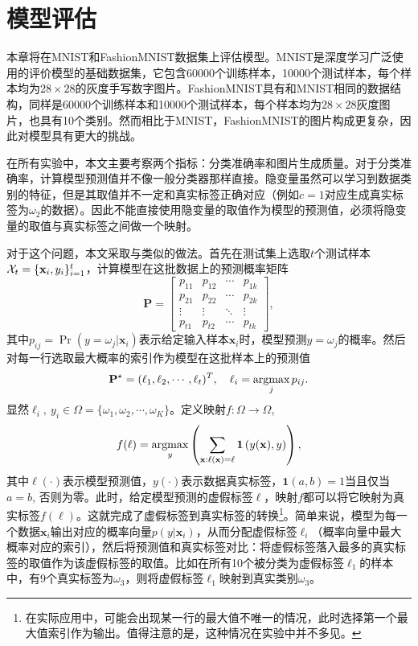 \chapter{模型评估}\label{chap:experiments}
本章将在MNIST\citep{lecun1989backpropagation}和FashionMNIST\citep{xiao2017/online}数据集上评估模型。MNIST是深度学习广泛使用的评价模型的基础数据集，它包含60000个训练样本，10000个测试样本，每个样本均为$28\times 28$的灰度手写数字图片。FashionMNIST具有和MNIST相同的数据结构，同样是60000个训练样本和10000个测试样本，每个样本均为$28\times 28$灰度图片，也具有10个类别。然而相比于MNIST，FashionMNIST的图片构成更复杂，因此对模型具有更大的挑战。

在所有实验中，本文主要考察两个指标：分类准确率和图片生成质量。对于分类准确率，计算模型预测值并不像一般分类器那样直接。隐变量虽然可以学习到数据类别的特征，但是其取值并不一定和真实标签正确对应（例如$c=1$对应生成真实标签为$\omega_2$的数据）。因此不能直接使用隐变量的取值作为模型的预测值，必须将隐变量的取值与真实标签之间做一个映射。

对于这个问题，本文采取与\citet{springenberg2015unsupervised}类似的做法。首先在测试集上选取$t$个测试样本$\mathcal{X}_t = \{\mathbf{x}_i, y_i\}_{i=1}^t$，计算模型在这批数据上的预测概率矩阵
\[
  \mathbf{P} = 
\begin{bmatrix}
  p_{11} & p_{12} & \cdots & p_{1k} \\
  p_{21} & p_{22} & \cdots & p_{2k} \\
  \vdots & \vdots & \ddots & \vdots \\
  p_{t1} & p_{t2} & \cdots & p_{tk}
\end{bmatrix},
\]
其中$p_{ij} = \Pr(y=\omega_j | \mathbf{x}_i)$表示给定输入样本$\mathbf{x}_i$时，模型预测$y = \omega_j$的概率。然后对每一行选取最大概率的索引作为模型在这批样本上的预测值
\[
  \mathbf{P}^{\star} = (\ell_1, \ell_2, \cdots, \ell_t)^T, \quad \ell_i = \mathop{\text{argmax}}_j p_{ij}.
\]
显然$\ell_i, ~y_i \in \Omega = \{\omega_1, \omega_2, \cdots, \omega_K\}$。定义映射$f: \Omega \to \Omega$,
\[
  f(\ell) = \mathop{\text{argmax}}_y \left( 
    \sum_{\mathbf{x}: \ell(\mathbf{x}) = \ell} \mathbf{1}\left(y(\mathbf{x}), y\right) 
  \right),
\]
其中$\ell(\cdot)$表示模型预测值，$y(\cdot)$表示数据真实标签，$\mathbf{1}(a, b) = 1$当且仅当$a = b$, 否则为零。此时，给定模型预测的虚假标签$\ell$，映射$f$都可以将它映射为真实标签$f(\ell)$。这就完成了虚假标签到真实标签的转换\footnote{在实际应用中，可能会出现某一行的最大值不唯一的情况，此时选择第一个最大值索引作为输出。值得注意的是，这种情况在实验中并不多见。}。简单来说，模型为每一个数据$\mathbf{x}_i$输出对应的概率向量$p(y|\mathbf{x}_i)$，从而分配虚假标签$\ell_i$（概率向量中最大概率对应的索引），然后将预测值和真实标签对比：将虚假标签落入最多的真实标签的取值作为该虚假标签的取值。比如在所有10个被分类为虚假标签$\ell_1$的样本中，有9个真实标签为$\omega_3$，则将虚假标签$\ell_1$映射到真实类别$\omega_3$。

